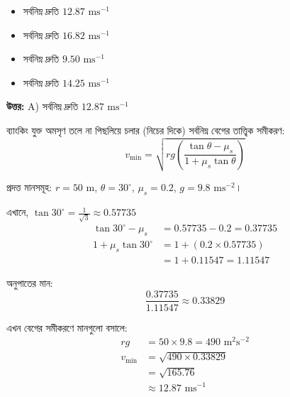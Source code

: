 \documentclass[12pt, a4paper]{article}
\begin{document}
\begin{itemize}[label={}, leftmargin=1cm, itemsep=0.5em]
    \item[\textbf{A)}] সর্বনিম্ন দ্রুতি $12.87\text{ ms}^{-1}$
    \item[\textbf{B)}] সর্বনিম্ন দ্রুতি $16.82\text{ ms}^{-1}$
    \item[\textbf{C)}] সর্বনিম্ন দ্রুতি $9.50\text{ ms}^{-1}$
    \item[\textbf{D)}] সর্বনিম্ন দ্রুতি $14.25\text{ ms}^{-1}$
\end{itemize}

\vspace{0.5em}
\begin{tcolorbox}[answerbox]
    \textbf{\color{success} উত্তর:} A) সর্বনিম্ন দ্রুতি $12.87\text{ ms}^{-1}$
\end{tcolorbox}
\vspace{1em}

\begin{tcolorbox}[solutionbox={সমাধান (Solution)}]
    \noindent
    ব্যাংকিং যুক্ত অমসৃণ তলে না পিছলিয়ে চলার (নিচের দিকে) সর্বনিম্ন বেগের তাত্ত্বিক সমীকরণ:
    \[ v_{\min} = \sqrt{r g \left(\frac{\tan\theta - \mu_s}{1 + \mu_s \tan\theta}\right)} \]
    
    প্রদত্ত মানসমূহ: $r = 50\text{ m}$, $\theta = 30^\circ$, $\mu_s = 0.2$, $g = 9.8\text{ ms}^{-2}$।
    
    এখানে, $\tan 30^\circ = \frac{1}{\sqrt{3}} \approx 0.57735$
    \begin{align*}
        \tan 30^\circ - \mu_s &= 0.57735 - 0.2 = 0.37735 \\
        1 + \mu_s \tan 30^\circ &= 1 + (0.2 \times 0.57735) \\
                                &= 1 + 0.11547 = 1.11547
    \end{align*}
    
    অনুপাতের মান:
    \[ \frac{0.37735}{1.11547} \approx 0.33829 \]
    
    এখন বেগের সমীকরণে মানগুলো বসালে:
    \begin{align*}
        r g &= 50 \times 9.8 = 490\text{ m}^2\text{s}^{-2} \\
        v_{\min} &= \sqrt{490 \times 0.33829} \\
                 &= \sqrt{165.76} \\
                 &\approx \mathbf{12.87}\text{ ms}^{-1}
    \end{align*}
\end{tcolorbox}
\end{document}

